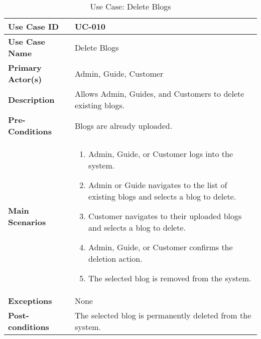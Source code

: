 \begin{table}[ht]
    \centering
    \begin{tabular}{|l|p{}|}
        \hline
        \textbf{Use Case ID} & UC-010 \\
        \hline
        \textbf{Use Case Name} & Delete Blogs \\
        \hline
        \textbf{Primary Actor(s)} & Admin, Guide, Customer \\
        \hline
        \textbf{Description} & Allows Admin, Guides, and Customers to delete existing blogs. \\
        \hline
        \textbf{Pre-Conditions} & Blogs are already uploaded. \\
        \hline
        \textbf{Main Scenarios} & 
        \begin{enumerate}[label=\arabic*.,itemsep=0pt]
            \item Admin, Guide, or Customer logs into the system.
            \item Admin or Guide navigates to the list of existing blogs and selects a blog to delete.
            \item Customer navigates to their uploaded blogs and selects a blog to delete.
            \item Admin, Guide, or Customer confirms the deletion action.
            \item The selected blog is removed from the system.
        \end{enumerate} \\
        \hline
        \textbf{Exceptions} & None \\
        \hline
        \textbf{Post-conditions} & The selected blog is permanently deleted from the system. \\
        \hline
    \end{tabular}
    \label{tab:use-case-delete-blogs}
    \caption{Use Case: Delete Blogs}
\end{table}


